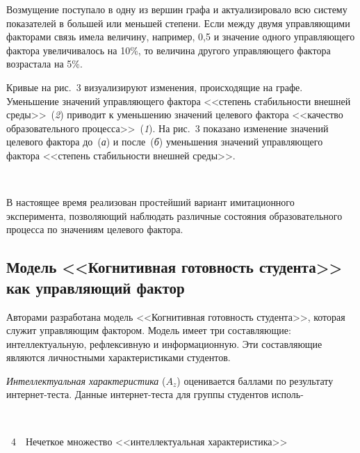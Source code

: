 \begin{multicols}{2}
     Возмущение поступало в одну из вершин графа и актуализировало всю 
систему показателей в большей или меньшей степени. Если между двумя 
управляющими факторами связь имела величину, например, 0,5 и значение 
одного управляющего фактора увеличивалось на 10\%, то величина другого 
управляющего фактора возрастала на 5\%. 

Кривые на рис.~3 визуализируют 
изменения, происходящие на графе. Уменьшение значений управляющего 
фактора <<степень стабильности внешней среды>>~(\textit{2}) приводит к 
уменьшению значений целевого фактора <<качество образовательного 
процесса>>~(\textit{1}). На рис.~3 показано изменение значений целевого фактора 
до~(\textit{а}) и после~(\textit{б}) уменьшения значений управ\-ля\-юще\-го 
фактора <<степень стабильности внешней среды>>. 
     
\setcounter{figure}{4}
\begin{figure*}[b] %
\vspace*{1pt}
 \begin{center}
 \mbox{%
 \epsfxsize=101.229mm
 }
 \end{center}
 \vspace*{-9pt}
\end{figure*}


     В настоящее время реализован простейший вариант имитационного 
эксперимента, позволя\-ющий наблюдать различные состояния 
образовательного процесса по значениям целевого фактора.
     
     \subsection{Модель <<Когнитивная готовность студента>> как 
управляющий фактор}
     
     Авторами разработана модель <<Когнитивная готовность студента>>, 
которая служит управляющим фактором. Модель имеет три составляющие: 
интеллектуальную, рефлексивную и информационную. Эти составляющие 
являются личностными характеристиками студентов.



     
     \textit{Интеллектуальная характеристика} ($A_z$) оценивается 
баллами по результату интернет-теста. Данные ин\-тер\-нет-тес\-та для 
группы студентов исполь-\linebreak

\vspace*{12pt}

\noindent
\begin{center}  %
 \mbox{%
 \epsfxsize=78.633mm
 }
  \end{center}
\begin{center}
{{\figurename~4}\ \ \small{Нечеткое множество <<интеллектуальная характеристика>>}}
\end{center}


\end{multicols}
